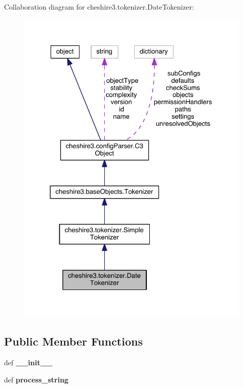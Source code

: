 Collaboration diagram for cheshire3.\-tokenizer.\-Date\-Tokenizer\-:
\nopagebreak
\begin{figure}[H]
\begin{center}
\leavevmode
\includegraphics[width=326pt]{classcheshire3_1_1tokenizer_1_1_date_tokenizer__coll__graph}
\end{center}
\end{figure}
\subsection*{Public Member Functions}
\begin{DoxyCompactItemize}
\item 
\hypertarget{classcheshire3_1_1tokenizer_1_1_date_tokenizer_a9b0c8fdf9e086c35a062f7a2675e517f}{def {\bfseries \-\_\-\-\_\-init\-\_\-\-\_\-}}\label{classcheshire3_1_1tokenizer_1_1_date_tokenizer_a9b0c8fdf9e086c35a062f7a2675e517f}

\item 
\hypertarget{classcheshire3_1_1tokenizer_1_1_date_tokenizer_a3dfa263c03ee49beabfc5652b954f147}{def {\bfseries process\-\_\-string}}\label{classcheshire3_1_1tokenizer_1_1_date_tokenizer_a3dfa263c03ee49beabfc5652b954f147}

\end{DoxyCompactItemize}
